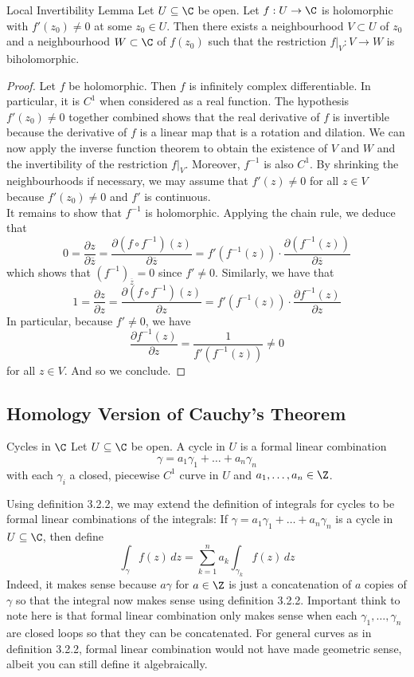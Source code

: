 \documentclass[a4paper]{article}
\begin{document}
\begin{lmm}{Local Invertibility Lemma}{} Let $U\subseteq\C$ be open. Let $f:U\to\C$ is holomorphic with $f'(z_0)\neq 0$ at some $z_0\in U$. Then there exists a neighbourhood $V\subset U$ of $z_0$ and a neighbourhood $W\subset\C$ of $f(z_0)$ such that the restriction $f|_V:V\to W$ is biholomorphic. 
\begin{proof}
Let $f$ be holomorphic. Then $f$ is infinitely complex differentiable. In particular, it is $C^1$ when considered as a real function. The hypothesis $f'(z_0)\neq 0$ together combined shows that the real derivative of $f$ is invertible because the derivative of $f$ is a linear map that is a rotation and dilation. We can now apply the inverse function theorem to obtain the existence of $V$ and $W$ and the invertibility of the restriction $f|_V$. Moreover, $f^{-1}$ is also $C^1$. By shrinking the neighbourhoods if necessary, we may assume that $f'(z)\neq 0$ for all $z\in V$ because $f'(z_0)\neq 0$ and $f'$ is continuous. \\

It remains to show that $f^{-1}$ is holomorphic. Applying the chain rule, we deduce that $$0=\frac{\partial z}{\partial\overline{z}}=\frac{\partial (f\circ f^{-1})(z)}{\partial\overline{z}}=f'(f^{-1}(z))\cdot\frac{\partial(f^{-1}(z))}{\partial\overline{z}}$$ which shows that $(f^{-1})_{\overline{z}}=0$ since $f'\neq 0$. Similarly, we have that $$1=\frac{\partial z}{\partial z}=\frac{\partial (f\circ f^{-1})(z)}{\partial z}=f'(f^{-1}(z))\cdot\frac{\partial f^{-1}(z)}{\partial z}$$ In particular, because $f'\neq 0$, we have $$\frac{\partial f^{-1}(z)}{\partial z}=\frac{1}{f'(f^{-1}(z))}\neq 0$$ for all $z\in V$. And so we conclude. 
\end{proof}
\end{lmm}

\subsection{Homology Version of Cauchy's Theorem}
\begin{defn}{Cycles in $\C$}{} Let $U\subseteq\C$ be open. A cycle in $U$ is a formal linear combination $$\gamma=a_1\gamma_1+\dots+a_n\gamma_n$$ with each $\gamma_i$ a closed, piecewise $C^1$ curve in $U$ and $a_1,\dots,a_n\in\Z$. 
\end{defn}

Using definition 3.2.2, we may extend the definition of integrals for cycles to be formal linear combinations of the integrals: If $\gamma=a_1\gamma_1+\dots+a_n\gamma_n$ is a cycle in $U\subseteq\C$, then define $$\int_\gamma f(z)\,dz=\sum_{k=1}^na_k\int_{\gamma_k}f(z)\,dz$$ Indeed, it makes sense because $a\gamma$ for $a\in\Z$ is just a concatenation of $a$ copies of $\gamma$ so that the integral now makes sense using definition 3.2.2. Important think to note here is that formal linear combination only makes sense when each $\gamma_1,\dots,\gamma_n$ are closed loops so that they can be concatenated. For general curves as in definition 3.2.2, formal linear combination would not have made geometric sense, albeit you can still define it algebraically. 
\end{document}
